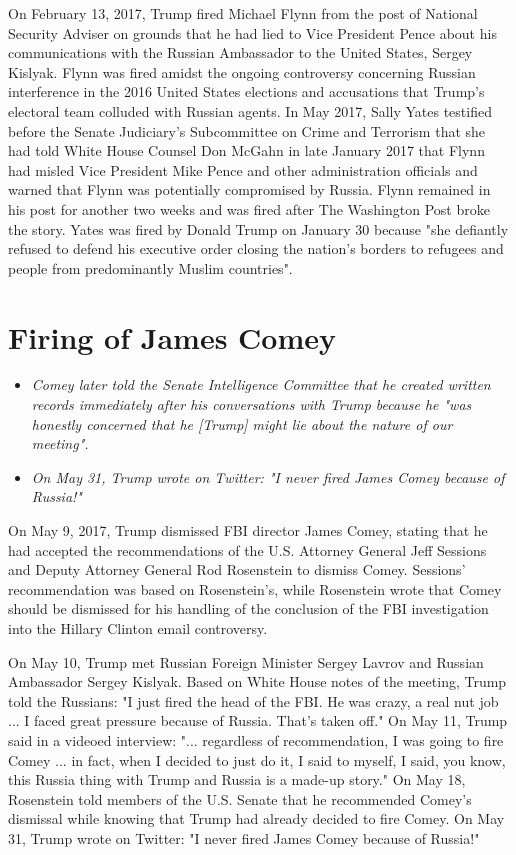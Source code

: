 On February 13, 2017, Trump fired Michael Flynn from the post of
National Security Adviser on grounds that he had lied to Vice President
Pence about his communications with the Russian Ambassador to the United
States, Sergey Kislyak. Flynn was fired amidst the ongoing controversy
concerning Russian interference in the 2016 United States elections and
accusations that Trump's electoral team colluded with Russian agents. In
May 2017, Sally Yates testified before the Senate Judiciary's
Subcommittee on Crime and Terrorism that she had told White House
Counsel Don McGahn in late January 2017 that Flynn had misled Vice
President Mike Pence and other administration officials and warned that
Flynn was potentially compromised by Russia. Flynn remained in his post
for another two weeks and was fired after The Washington Post broke the
story. Yates was fired by Donald Trump on January 30 because "she
defiantly refused to defend his executive order closing the nation's
borders to refugees and people from predominantly Muslim countries".

\section{Firing of James Comey}\label{firing-of-james-comey}

\begin{itemize}
\item
  \emph{Comey later told the Senate Intelligence Committee that he
  created written records immediately after his conversations with Trump
  because he "was honestly concerned that he {[}Trump{]} might lie about
  the nature of our meeting".}
\item
  \emph{On May 31, Trump wrote on Twitter: "I never fired James Comey
  because of Russia!"}
\end{itemize}

On May 9, 2017, Trump dismissed FBI director James Comey, stating that
he had accepted the recommendations of the U.S. Attorney General Jeff
Sessions and Deputy Attorney General Rod Rosenstein to dismiss Comey.
Sessions' recommendation was based on Rosenstein's, while Rosenstein
wrote that Comey should be dismissed for his handling of the conclusion
of the FBI investigation into the Hillary Clinton email controversy.

On May 10, Trump met Russian Foreign Minister Sergey Lavrov and Russian
Ambassador Sergey Kislyak. Based on White House notes of the meeting,
Trump told the Russians: "I just fired the head of the FBI. He was
crazy, a real nut job ... I faced great pressure because of Russia.
That's taken off." On May 11, Trump said in a videoed interview: "...
regardless of recommendation, I was going to fire Comey ... in fact,
when I decided to just do it, I said to myself, I said, you know, this
Russia thing with Trump and Russia is a made-up story." On May 18,
Rosenstein told members of the U.S. Senate that he recommended Comey's
dismissal while knowing that Trump had already decided to fire Comey. On
May 31, Trump wrote on Twitter: "I never fired James Comey because of
Russia!"

